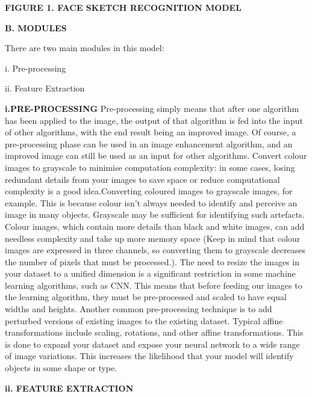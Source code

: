\documentclass[journal]{IEEEtran} %
\begin{document}
\textbf\textbf{{FIGURE 1. FACE SKETCH RECOGNITION MODEL}
}

\vspace \textbf{\textbf{B. MODULES}}

There are two main modules in this model:

i.	Pre-processing

ii.	Feature Extraction

\textbf{i.PRE-PROCESSING}
Pre-processing simply means that after one algorithm has been applied to the image, the output of that algorithm is fed into the input of other algorithms, with the end result being an improved image. Of course, a pre-processing phase can be used in an image enhancement algorithm, and an improved image can still be used as an input for other algorithms.
Convert colour images to grayscale to minimise computation complexity: in some cases, losing redundant details from your images to save space or reduce computational complexity is a good idea.Converting coloured images to grayscale images, for example. This is because colour isn't always needed to identify and perceive an image in many objects. Grayscale may be sufficient for identifying such artefacts. Colour images, which contain more details than black and white images, can add needless complexity and take up more memory space (Keep in mind that colour images are expressed in three channels, so converting them to grayscale decreases the number of pixels that must be processed.).
The need to resize the images in your dataset to a unified dimension is a significant restriction in some machine learning algorithms, such as CNN. This means that before feeding our images to the learning algorithm, they must be pre-processed and scaled to have equal widths and heights.
Another common pre-processing technique is to add perturbed versions of existing images to the existing dataset. Typical affine transformations include scaling, rotations, and other affine transformations. This is done to expand your dataset and expose your neural network to a wide range of image variations. This increases the likelihood that your model will identify objects in some shape or type.


\vspace\textbf{\textbf{ii. FEATURE EXTRACTION}}
\end{document}
